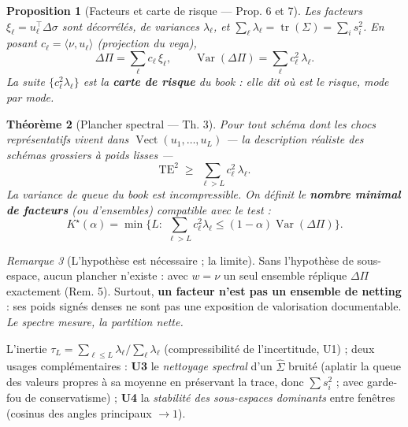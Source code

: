 \documentclass[11pt,a4paper]{article}
\DeclareMathOperator{\Var}{Var}
\DeclareMathOperator{\tr}{tr}
\DeclareMathOperator{\Vect}{Vect}
\newcommand{\dsig}{\Delta\sigma}
\newcommand{\dPi}{\Delta\Pi}
\theoremstyle{plain}
\newtheorem{theoreme}{Théorème}[section]
\newtheorem{proposition}[theoreme]{Proposition}
\theoremstyle{definition}
\theoremstyle{remark}
\newtheorem{remarque}[theoreme]{Remarque}
\begin{document}
\begin{proposition}[Facteurs et carte de risque --- Prop. 6 et 7]\label{prop:spectral}
Les \emph{facteurs} $\xi_\ell = u_\ell^\top \dsig$ sont décorrélés, de variances
$\lambda_\ell$, et $\sum_\ell \lambda_\ell = \tr(\Sigma) = \sum_i s_i^2$. En posant
$c_\ell = \langle \nu, u_\ell\rangle$ (projection du vega),
\begin{equation}
\dPi = \sum_\ell c_\ell\, \xi_\ell,
\qquad
\Var(\dPi) = \sum_\ell c_\ell^2\, \lambda_\ell .
\label{eq:spectral-var}
\end{equation}
La suite $\{c_\ell^2\lambda_\ell\}$ est la \textbf{carte de risque} du book : elle dit
\emph{où} est le risque, mode par mode.
\end{proposition}

\begin{theoreme}[Plancher spectral --- Th. 3]\label{th:spectral}
Pour tout schéma dont les chocs représentatifs vivent dans
$\Vect(u_1,\dots,u_L)$ --- la description réaliste des schémas grossiers à poids
lisses ---
\begin{equation}
\mathrm{TE}^2 \;\ge\; \sum_{\ell>L} c_\ell^2\,\lambda_\ell .
\label{eq:spectral-floor}
\end{equation}
La variance de \emph{queue} du book est incompressible. On définit le \textbf{nombre
minimal de facteurs} (ou d'ensembles) compatible avec le test :
\begin{equation}
K^\star(\alpha) = \min\Big\{ L :\ \textstyle\sum_{\ell>L} c_\ell^2\lambda_\ell
\le (1-\alpha)\Var(\dPi) \Big\}.
\label{eq:kstar}
\end{equation}
\end{theoreme}

\begin{remarque}[L'hypothèse est nécessaire ; la limite]
Sans l'hypothèse de sous-espace, aucun plancher n'existe : avec $w=\nu$ un seul
ensemble réplique $\dPi$ exactement (Rem. 5). Surtout, \textbf{un facteur n'est pas un
ensemble de netting} : ses poids signés denses ne sont pas une exposition de
valorisation documentable. \emph{Le spectre mesure, la partition nette.}
\end{remarque}

L'inertie $\tau_L = \sum_{\ell\le L}\lambda_\ell / \sum_\ell\lambda_\ell$ (compressibilité
de l'incertitude, U1) ; deux usages complémentaires : \textbf{U3} le \emph{nettoyage
spectral} d'un $\hat\Sigma$ bruité (aplatir la queue des valeurs propres à sa moyenne
en préservant la trace, donc $\sum s_i^2$ ; avec garde-fou de conservatisme) ;
\textbf{U4} la \emph{stabilité des sous-espaces dominants} entre fenêtres (cosinus des
angles principaux $\to 1$).
\end{document}
